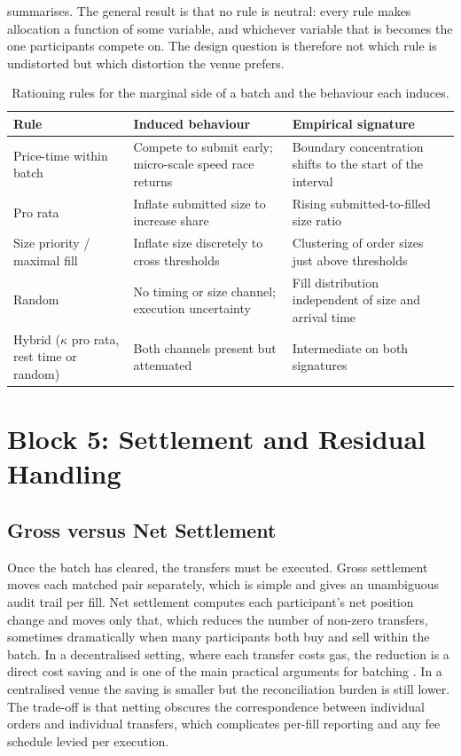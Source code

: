  summarises. The general result is that no rule is
neutral: every rule makes allocation a function of some variable, and
whichever variable that is becomes the one participants compete on.
The design question is therefore not which rule is undistorted but which
distortion the venue prefers.

\begin{table}[htbp]
\centering
\caption[Rationing rules and induced behaviour]{Rationing rules for the
marginal side of a batch and the behaviour each induces.}
\label{tab:rationing}
\small
\begin{tabularx}{\textwidth}{@{}p{3.0cm} L p{3.0cm}@{}}
\toprule
\textbf{Rule} & \textbf{Induced behaviour} & \textbf{Empirical
signature}\\
\midrule
Price-time within batch & Compete to submit early; micro-scale speed
race returns & Boundary concentration shifts to the start of the
interval\\
Pro rata & Inflate submitted size to increase share & Rising
submitted-to-filled size ratio\\
Size priority / maximal fill & Inflate size discretely to cross
thresholds & Clustering of order sizes just above thresholds\\
Random & No timing or size channel; execution uncertainty & Fill
distribution independent of size and arrival time\\
Hybrid ($\kappa$ pro rata, rest time or random) & Both channels present
but attenuated & Intermediate on both signatures\\
\bottomrule
\end{tabularx}
\end{table}

\section{Block 5: Settlement and Residual Handling}
\label{sec:settlement}

\subsection{Gross versus Net Settlement}

Once the batch has cleared, the transfers must be executed. Gross
settlement moves each matched pair separately, which is simple and
gives an unambiguous audit trail per fill. Net settlement computes each
participant's net position change and moves only that, which reduces the
number of non-zero transfers, sometimes dramatically when many
participants both buy and sell within the batch. In a decentralised
setting, where each transfer costs gas, the reduction is a direct cost
saving and is one of the main practical arguments for batching
\citep{wang2018loopring,gong2023fbadex}. In a centralised venue the
saving is smaller but the reconciliation burden is still lower. The
trade-off is that netting obscures the correspondence between individual
orders and individual transfers, which complicates per-fill reporting
and any fee schedule levied per execution.

